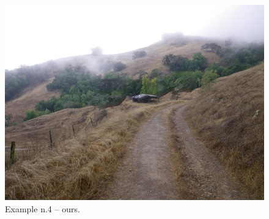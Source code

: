 \documentclass[a4paper, 11pt]{article}
\begin{document}
\begin{figure}
    \centering
    \includegraphics[width=.95\linewidth]{documentation/img/modified/0031.png}
    \caption{Example n.4 -- ours.}
    \label{img:ex_n.4_mask}
\end{figure}
\end{document}
